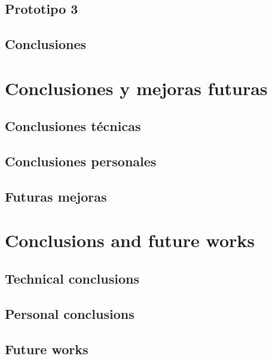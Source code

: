 \documentclass[twoside, openright, 11pt]{report}
\begin{document}
  \section{Prototipo 3}
  \section{Conclusiones}

\chapter{Conclusiones y mejoras futuras}\label{cap.conclusiones y mejoras futuras}
  \section{Conclusiones técnicas}
  \section{Conclusiones personales}
  \section{Futuras mejoras}

\chapter{Conclusions and future works}\label{cap.conclusions and future works}
  \section{Technical conclusions}
  \section{Personal conclusions}
  \section{Future works}

\cleardoublepage
{}
\end{document}

